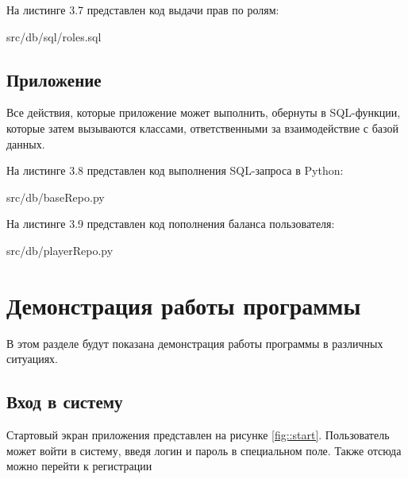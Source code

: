 На листинге 3.7 представлен код выдачи прав по ролям:
\FloatBarrier
\begin{lstinputlisting}[language=SQL, caption=Выдача прав ролям, 
	basicstyle=\footnotesize\ttfamily, frame=single,breaklines=true]{src/db/sql/roles.sql}
\end{lstinputlisting}
\FloatBarrier

\subsection{Приложение}
Все действия, которые приложение может выполнить, обернуты в SQL-функции, которые затем вызываются классами, ответственными за взаимодействие с базой данных.

На листинге 3.8 представлен код выполнения SQL-запроса в Python:
\FloatBarrier
\begin{lstinputlisting}[language=Python, caption=Выполнение SQL-запроса, linerange = {11-28},
	basicstyle=\footnotesize\ttfamily, frame=single,breaklines=true]{src/db/baseRepo.py}
\end{lstinputlisting}
\FloatBarrier

На листинге 3.9 представлен код пополнения баланса пользователя:
\FloatBarrier
\begin{lstinputlisting}[language=Python, caption=Пополнение баланса пользователя, linerange = {44-47},
	basicstyle=\footnotesize\ttfamily, frame=single,breaklines=true]{src/db/playerRepo.py}
\end{lstinputlisting}
\FloatBarrier

\section{Демонстрация работы программы}
В этом разделе будут показана демонстрация работы программы в различных ситуациях.

\subsection{Вход в систему}
Стартовый экран приложения представлен на рисунке \ref{fig::start}. 
Пользователь может войти в систему, введя логин и пароль в специальном поле.
Также отсюда можно перейти к регистрации

